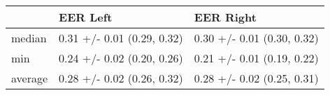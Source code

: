 \begin{tabular}{lll}
\toprule
{} &                    EER Left &                   EER Right \\
\midrule
median  &  0.31 +/- 0.01 (0.29, 0.32) &  0.30 +/- 0.01 (0.30, 0.32) \\
min     &  0.24 +/- 0.02 (0.20, 0.26) &  0.21 +/- 0.01 (0.19, 0.22) \\
average &  0.28 +/- 0.02 (0.26, 0.32) &  0.28 +/- 0.02 (0.25, 0.31) \\
\bottomrule
\end{tabular}
